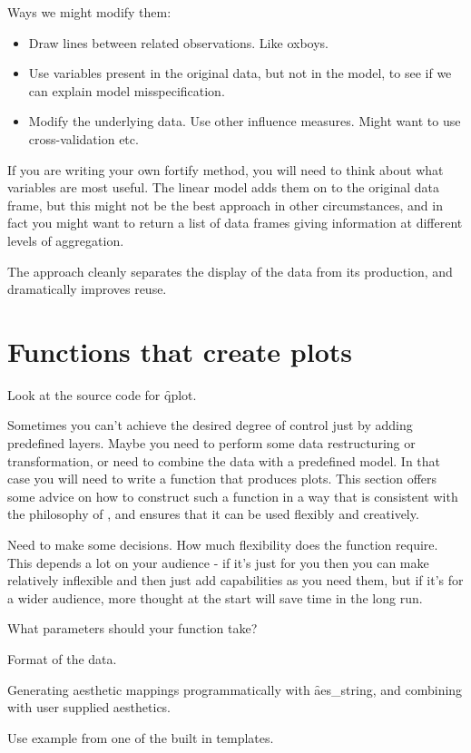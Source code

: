 Ways we might modify them:

\begin{itemize}
  \item Draw lines between related observations.  Like oxboys.

  \item Use variables present in the original data, but not in the model, to see if we can explain model misspecification.
  \item Modify the underlying data. Use other influence measures.  Might want to use cross-validation etc.
\end{itemize}

If you are writing your own fortify method, you will need to think about what variables are most useful.  The linear model adds them on to the original data frame, but this might not be the best approach in other circumstances, and in fact you might want to return a list of data frames giving information at different levels of aggregation.

The approach cleanly separates the display of the data from its production, and dramatically improves reuse.  

\section{Functions that create plots}
\label{sec:functions}

Look at the source code for \f{qplot}.

Sometimes you can't achieve the desired degree of control just by adding predefined layers.  Maybe you need to perform some data restructuring or transformation, or need to combine the data with a predefined model.  In that case you will need to write a function that produces \ggplot plots.  This section offers some advice on how to construct such a function in a way that is consistent with the philosophy of \ggplot, and ensures that it can be used flexibly and creatively.

Need to make some decisions.  How much flexibility does the function require.  This depends a lot on your audience - if it's just for you then you can make relatively inflexible and then just add capabilities as you need them, but if it's for a wider audience, more thought at the start will save time in the long run.

What parameters should your function take?

Format of the data.

Generating aesthetic mappings programmatically with \f{aes_string}, and combining with user supplied aesthetics.

Use example from one of the built in templates.  



